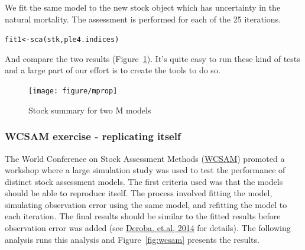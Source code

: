 \documentclass[a4paper,english,10pt]{article}\usepackage[]{graphicx}\usepackage[]{color}
\makeatletter
\newcommand{\hlstd}[1]{\textcolor[rgb]{0,0,0}{#1}}%
\newcommand{\hlkwb}[1]{\textcolor[rgb]{0.361,0.506,0.596}{#1}}%
\newcommand{\hlkwd}[1]{\textcolor[rgb]{0.361,0.506,0.596}{#1}}%
\newenvironment{kframe}{%
 \def\at@end@of@kframe{}%
 \ifinner\ifhmode%
  \def\at@end@of@kframe{\end{minipage}}%
  \begin{minipage}{\columnwidth}%
 \fi\fi%
 \def\FrameCommand##1{\hskip\@totalleftmargin \hskip-\fboxsep
 \colorbox{shadecolor}{##1}\hskip-\fboxsep
     \hskip-\linewidth \hskip-\@totalleftmargin \hskip\columnwidth}%
 \MakeFramed {\advance\hsize-\width
   \@totalleftmargin\z@ \linewidth\hsize
   \@setminipage}}%
 {\par\unskip\endMakeFramed%
 \at@end@of@kframe}
\newenvironment{knitrout}{}{} %
\makeatother
\begin{document}
We fit the same model to the new stock object which has uncertainty in the natural mortality.
The assessment is performed for each of the 25 iterations.

\begin{knitrout}
\color{fgcolor}\begin{kframe}
\begin{alltt}
\hlstd{fit1} \hlkwb{<-} \hlkwd{sca}\hlstd{(stk, ple4.indices)}
\end{alltt}
\end{kframe}
\end{knitrout}

And compare the two results (Figure~\ref{fig:mprop}). It's quite easy to run these kind of tests and a large part of our effort is to create the tools to do so. 

\begin{knitrout}
\color{fgcolor}\begin{figure}[H]


{\centering \texttt{[image: figure/mprop]} 

}

\caption[Stock summary for two M models]{Stock summary for two M models\label{fig:mprop}}
\end{figure}


\end{knitrout}



\subsubsection{WCSAM exercise - replicating itself}

The World Conference on Stock Assessment Methods (\href{http://www.ices.dk/news-and-events/symposia/WCSAM-2013}{WCSAM}) promoted a workshop where a large simulation study was used to test the performance of distinct stock assessment models. The first criteria used was that the models should be able to reproduce itself. The process involved fitting the model, simulating observation error using the same model, and refitting the model to each iteration. The final results should be similar to the fitted results before observation error was added (see \href{http://icesjms.oxfordjournals.org/content/early/2014/01/18/icesjms.fst237.abstract}{Deroba, et.al, 2014} for details). The following analysis runs this analysis and Figure~\ref{fig:wcsam} presents the results.
\end{document}
